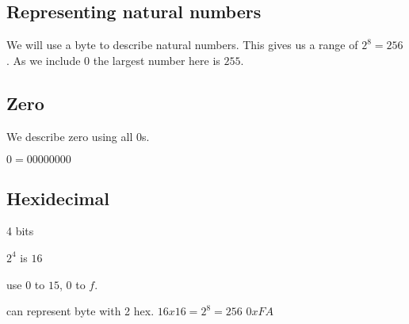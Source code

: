 
\subsection{Representing natural numbers}

We will use a byte to describe natural numbers. This gives us a range of \(2^8=256\). As we include \(0\) the largest number here is \(255\).

\subsection{Zero}

We describe zero using all \(0\)s.

\(0=00000000\)

\subsection{Hexidecimal}

4 bits

\(2^4\) is \(16\)

use \(0\) to \(15\), \(0\) to \(f\).


can represent byte with 2 hex.
\(16 x 16 = 2^8 = 256\)
\(0xFA\)
